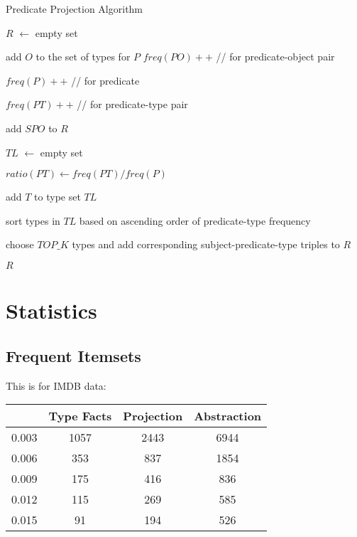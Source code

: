 \documentclass{acm_proc_article-sp}
\begin{document}
\begin{algorithm}
\label{algo1}
\caption{Predicate Projection Algorithm}

\SetAlgoLined
{}
$R$ $\leftarrow$ empty set

 {
	 {
		add $O$ to the set of types for $P$
	}
	$freq(PO)++$  //  for predicate-object pair

	$freq(P)++$  //  for predicate
}

 {
	 {
		$freq(PT)++$  //  for predicate-type pair
	}
}

 {
	 {
		add $SPO$ to $R$
	}
}
 {

	$TL$ $\leftarrow$ empty set

	 {
		$ratio(PT) \leftarrow freq(PT) / freq(P)$

		 {
			add $T$ to type set $TL$
		}
	}
	sort types in $TL$ based on ascending order of predicate-type frequency

	choose $TOP\_K$ types and add corresponding subject-predicate-type triples to $R$

}

\Return $R$

\end{algorithm}

\section{Statistics}

\subsection{Frequent Itemsets}

This is for IMDB data:

\begin{center}
\begin{tabular}{ |c|c|c|c| } 
\hline
 & Type Facts & Projection & Abstraction\\
\hline
0.003 & 1057 & 2443 & 6944 \\
0.006 & 353 & 837 & 1854 \\
0.009 & 175 & 416 & 836 \\
0.012 & 115 & 269 & 585 \\
0.015 & 91 & 194 & 526 \\
\hline
\end{tabular}
\end{center}
\end{document}
